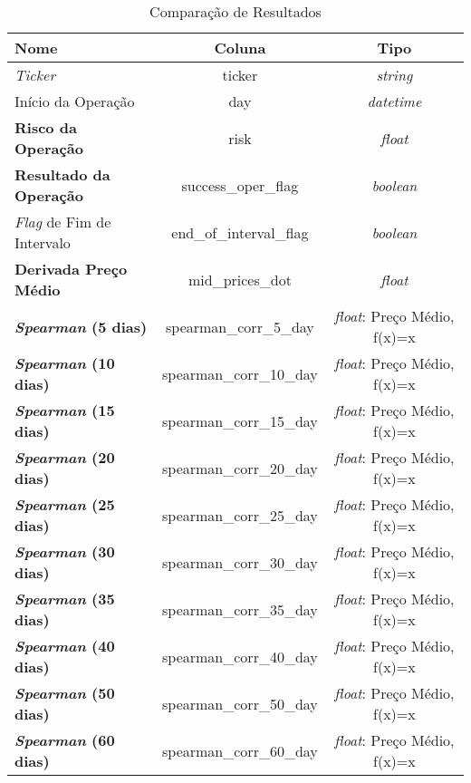 \begin{table}[h!]
    \begin{center}
        \begin{tabular}{ l|c|c }
            Nome & Coluna & Tipo \\
            \hline
            \textit{Ticker} & ticker & \textit{string} \\
            Início da Operação & day & \textit{datetime} \\
            \textbf{Risco da Operação} & risk & \textit{float} \\
            \textbf{Resultado da Operação} & success\_oper\_flag & \textit{boolean} \\
            \textit{Flag} de Fim de Intervalo & end\_of\_interval\_flag & \textit{boolean} \\
            \textbf{Derivada Preço Médio} & mid\_prices\_dot & \textit{float} \\
            \textbf{\textit{Spearman} (5 dias)} & spearman\_corr\_5\_day & \textit{float}: Preço Médio, f(x)=x \\
            \textbf{\textit{Spearman} (10 dias)} & spearman\_corr\_10\_day & \textit{float}: Preço Médio, f(x)=x \\
            \textbf{\textit{Spearman} (15 dias)} & spearman\_corr\_15\_day & \textit{float}: Preço Médio, f(x)=x \\
            \textbf{\textit{Spearman} (20 dias)} & spearman\_corr\_20\_day & \textit{float}: Preço Médio, f(x)=x \\
            \textbf{\textit{Spearman} (25 dias)} & spearman\_corr\_25\_day & \textit{float}: Preço Médio, f(x)=x \\
            \textbf{\textit{Spearman} (30 dias)} & spearman\_corr\_30\_day & \textit{float}: Preço Médio, f(x)=x \\
            \textbf{\textit{Spearman} (35 dias)} & spearman\_corr\_35\_day & \textit{float}: Preço Médio, f(x)=x \\
            \textbf{\textit{Spearman} (40 dias)} & spearman\_corr\_40\_day & \textit{float}: Preço Médio, f(x)=x \\
            \textbf{\textit{Spearman} (50 dias)} & spearman\_corr\_50\_day & \textit{float}: Preço Médio, f(x)=x \\
            \textbf{\textit{Spearman} (60 dias)} & spearman\_corr\_60\_day & \textit{float}: Preço Médio, f(x)=x \\
        \end{tabular}
        \caption{Comparação de Resultados}
        \label{tab:7}
    \end{center}
\end{table}

